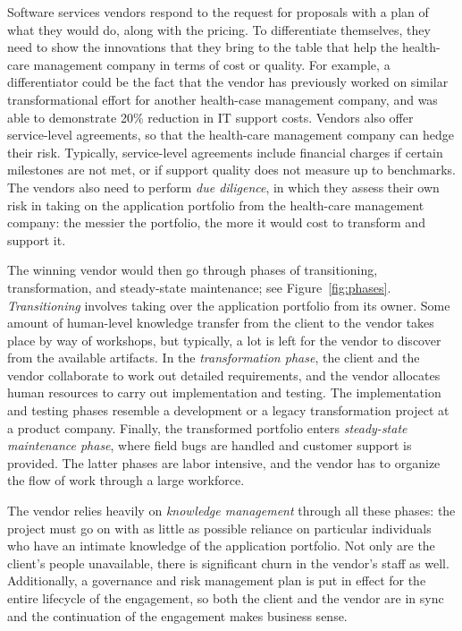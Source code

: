 Software services vendors respond to the request for proposals with a plan of
what they would do, along with the pricing. To differentiate themselves, they
need to show the innovations that they bring to the table that help the
health-care management company in terms of cost or quality. For example, a
differentiator could be the fact that the vendor has previously worked on similar
transformational effort for another health-case management company, and was able
to demonstrate 20\% reduction in IT support costs. 
Vendors also offer service-level agreements, so that the
health-care management company can hedge their risk.  Typically, service-level
agreements include financial charges if certain milestones are not met, or if
support quality does not measure up to benchmarks. The vendors also need to
perform \textit{due diligence}, in which they assess their own risk in taking on
the application portfolio from the health-care management company: the messier
the portfolio, the more it would cost to transform and support it.

The winning vendor would then go through phases of transitioning,
transformation, and steady-state maintenance; see
Figure~\ref{fig:phases}. \textit{Transitioning} involves taking over the
application portfolio from its owner. Some amount of human-level knowledge
transfer from the client to the vendor takes place by way of workshops, but
typically, a lot is left for the vendor to discover from the available
artifacts. In the \textit{transformation phase}, the client and the vendor
collaborate to work out detailed requirements, and the vendor allocates human
resources to carry out implementation and testing. The implementation and
testing phases resemble a development or a legacy transformation project at a
product company.  Finally, the transformed portfolio enters \textit{steady-state
  maintenance phase}, where field bugs are handled and customer support is
provided.  The latter phases are labor intensive, and the vendor has to organize
the flow of work through a large workforce.

The vendor relies heavily on \textit{knowledge management} through all these
phases: the project must go on with as little as possible reliance on particular
individuals who have an intimate knowledge of the application portfolio. Not
only are the client's people unavailable, there is significant churn in the
vendor's staff as well.  Additionally, a governance and risk management plan is
put in effect for the entire lifecycle of the engagement, so both the client and
the vendor are in sync and the continuation of the engagement makes business
sense.

